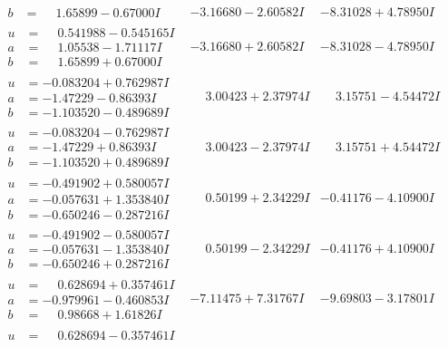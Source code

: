 \documentclass[1p]{elsarticle_modified}
\theoremstyle{definition}
\begin{document}
$$\begin{array}{c|c|c}
\begin{aligned}
b &= \phantom{-}1.65899 - 0.67000 I\end{aligned}
 & -3.16680 - 2.60582 I & -8.31028 + 4.78950 I \\ \hline\begin{aligned}
u &= \phantom{-}0.541988 - 0.545165 I \\
a &= \phantom{-}1.05538 - 1.71117 I \\
b &= \phantom{-}1.65899 + 0.67000 I\end{aligned}
 & -3.16680 + 2.60582 I & -8.31028 - 4.78950 I \\ \hline\begin{aligned}
u &= -0.083204 + 0.762987 I \\
a &= -1.47229 - 0.86393 I \\
b &= -1.103520 - 0.489689 I\end{aligned}
 & \phantom{-}3.00423 + 2.37974 I & \phantom{-}3.15751 - 4.54472 I \\ \hline\begin{aligned}
u &= -0.083204 - 0.762987 I \\
a &= -1.47229 + 0.86393 I \\
b &= -1.103520 + 0.489689 I\end{aligned}
 & \phantom{-}3.00423 - 2.37974 I & \phantom{-}3.15751 + 4.54472 I \\ \hline\begin{aligned}
u &= -0.491902 + 0.580057 I \\
a &= -0.057631 + 1.353840 I \\
b &= -0.650246 - 0.287216 I\end{aligned}
 & \phantom{-}0.50199 + 2.34229 I & -0.41176 - 4.10900 I \\ \hline\begin{aligned}
u &= -0.491902 - 0.580057 I \\
a &= -0.057631 - 1.353840 I \\
b &= -0.650246 + 0.287216 I\end{aligned}
 & \phantom{-}0.50199 - 2.34229 I & -0.41176 + 4.10900 I \\ \hline\begin{aligned}
u &= \phantom{-}0.628694 + 0.357461 I \\
a &= -0.979961 - 0.460853 I \\
b &= \phantom{-}0.98668 + 1.61826 I\end{aligned}
 & -7.11475 + 7.31767 I & -9.69803 - 3.17801 I \\ \hline\begin{aligned}
u &= \phantom{-}0.628694 - 0.357461 I \\

\end{aligned}
\end{array}$$
\end{document}
